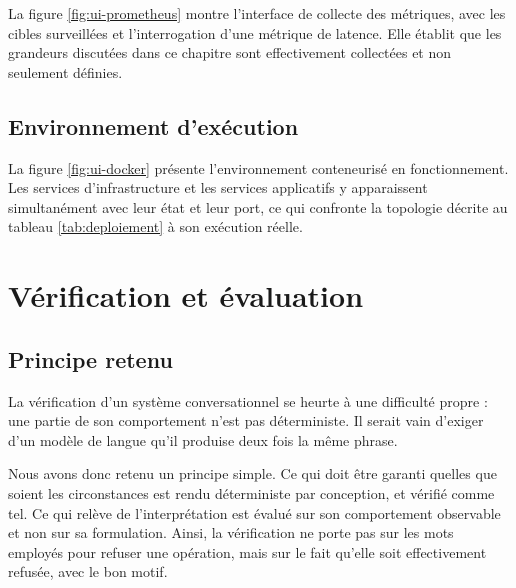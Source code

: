
La figure \ref{fig:ui-prometheus} montre l'interface de collecte des métriques, avec les cibles surveillées et l'interrogation d'une métrique de latence. Elle établit que les grandeurs discutées dans ce chapitre sont effectivement collectées et non seulement définies.


\subsection{Environnement d'exécution}

La figure \ref{fig:ui-docker} présente l'environnement conteneurisé en fonctionnement. Les services d'infrastructure et les services applicatifs y apparaissent simultanément avec leur état et leur port, ce qui confronte la topologie décrite au tableau \ref{tab:deploiement} à son exécution réelle.


\section{Vérification et évaluation}

\subsection{Principe retenu}

La vérification d'un système conversationnel se heurte à une difficulté propre : une partie de son comportement n'est pas déterministe. Il serait vain d'exiger d'un modèle de langue qu'il produise deux fois la même phrase.

Nous avons donc retenu un principe simple. Ce qui doit être garanti quelles que soient les circonstances est rendu déterministe par conception, et vérifié comme tel. Ce qui relève de l'interprétation est évalué sur son comportement observable et non sur sa formulation. Ainsi, la vérification ne porte pas sur les mots employés pour refuser une opération, mais sur le fait qu'elle soit effectivement refusée, avec le bon motif.


